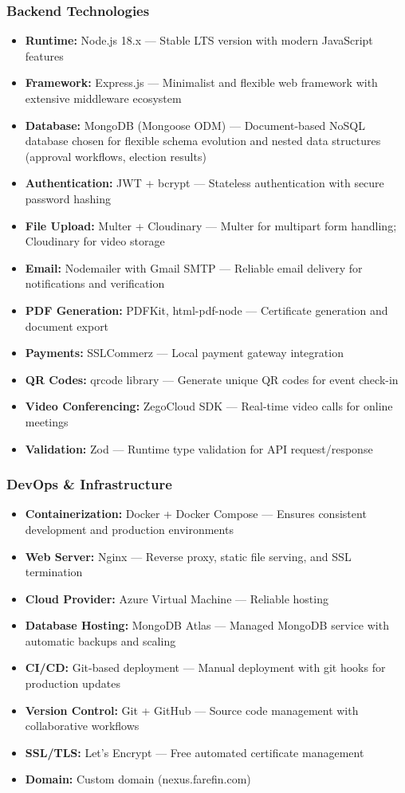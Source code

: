 \documentclass[12pt,a4paper]{article}
\begin{document}
\subsubsection{Backend Technologies}
\begin{itemize}[noitemsep]
  \item \textbf{Runtime:} Node.js 18.x — Stable LTS version with modern JavaScript features
  \item \textbf{Framework:} Express.js — Minimalist and flexible web framework with extensive middleware ecosystem
  \item \textbf{Database:} MongoDB (Mongoose ODM) — Document-based NoSQL database chosen for flexible schema evolution and nested data structures (approval workflows, election results)
  \item \textbf{Authentication:} JWT + bcrypt — Stateless authentication with secure password hashing
  \item \textbf{File Upload:} Multer + Cloudinary — Multer for multipart form handling; Cloudinary for video storage
  \item \textbf{Email:} Nodemailer with Gmail SMTP — Reliable email delivery for notifications and verification
  \item \textbf{PDF Generation:} PDFKit, html-pdf-node — Certificate generation and document export
  \item \textbf{Payments:} SSLCommerz — Local payment gateway integration
  \item \textbf{QR Codes:} qrcode library — Generate unique QR codes for event check-in
  \item \textbf{Video Conferencing:} ZegoCloud SDK — Real-time video calls for online meetings
  \item \textbf{Validation:} Zod — Runtime type validation for API request/response
\end{itemize}

\subsubsection{DevOps \& Infrastructure}
\begin{itemize}[noitemsep]
  \item \textbf{Containerization:} Docker + Docker Compose — Ensures consistent development and production environments
  \item \textbf{Web Server:} Nginx — Reverse proxy, static file serving, and SSL termination
  \item \textbf{Cloud Provider:} Azure Virtual Machine — Reliable hosting
  \item \textbf{Database Hosting:} MongoDB Atlas — Managed MongoDB service with automatic backups and scaling
  \item \textbf{CI/CD:} Git-based deployment — Manual deployment with git hooks for production updates
  \item \textbf{Version Control:} Git + GitHub — Source code management with collaborative workflows
  \item \textbf{SSL/TLS:} Let's Encrypt — Free automated certificate management
  \item \textbf{Domain:} Custom domain (nexus.farefin.com) 
\end{itemize}
\end{document}
